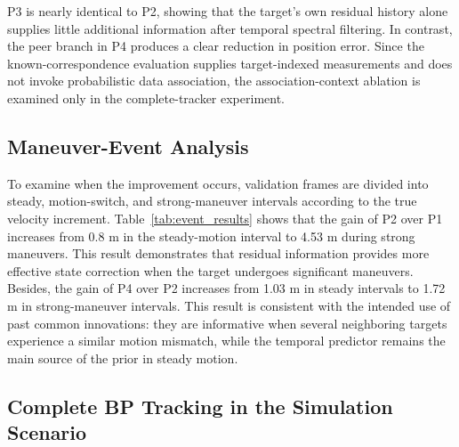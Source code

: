 \documentclass[10pt,doublecolumn]{IEEEtaes}
\begin{document}
P3 is nearly identical to P2, showing that the target's own residual history alone supplies little additional information after temporal spectral filtering. In contrast, the peer branch in P4 produces a clear reduction in position error. Since the known-correspondence evaluation supplies target-indexed measurements and does not invoke probabilistic data association, the association-context ablation is examined only in the complete-tracker experiment.

\subsection{Maneuver-Event Analysis}

To examine when the improvement occurs, validation frames are divided into steady, motion-switch, and strong-maneuver intervals according to the true velocity increment. Table~\ref{tab:event_results} shows that the gain of P2 over P1 increases from 0.8 m in the steady-motion interval to 4.53 m during strong maneuvers. This result demonstrates that residual information provides more effective state correction when the target undergoes significant maneuvers. Besides, the gain of P4 over P2 increases from 1.03 m in steady intervals to 1.72 m in strong-maneuver intervals. This result is consistent with the intended use of past common innovations: they are informative when several neighboring targets experience a similar motion mismatch, while the temporal predictor remains the main source of the prior in steady motion.

\begin{table}[!t]
\centering
\caption{Prior position RMSE and P4 improvement in different motion intervals on the validation set.}
\label{tab:event_results}
\end{table}

\subsection{Complete BP Tracking in the Simulation Scenario}
\end{document}
